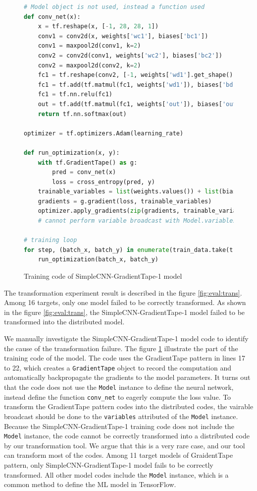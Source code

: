 \begin{figure}[!ht]
  \begin{lstlisting}[language=Python]
# Model object is not used, instead a function used
def conv_net(x):
    x = tf.reshape(x, [-1, 28, 28, 1])
    conv1 = conv2d(x, weights['wc1'], biases['bc1'])
    conv1 = maxpool2d(conv1, k=2)
    conv2 = conv2d(conv1, weights['wc2'], biases['bc2'])
    conv2 = maxpool2d(conv2, k=2)
    fc1 = tf.reshape(conv2, [-1, weights['wd1'].get_shape().as_list()[0]])
    fc1 = tf.add(tf.matmul(fc1, weights['wd1']), biases['bd1'])
    fc1 = tf.nn.relu(fc1)
    out = tf.add(tf.matmul(fc1, weights['out']), biases['out'])
    return tf.nn.softmax(out)

optimizer = tf.optimizers.Adam(learning_rate)

def run_optimization(x, y):
    with tf.GradientTape() as g:
        pred = conv_net(x)
        loss = cross_entropy(pred, y) 
    trainable_variables = list(weights.values()) + list(biases.values())
    gradients = g.gradient(loss, trainable_variables)
    optimizer.apply_gradients(zip(gradients, trainable_variables))
    # cannot perform variable broadcast with Model.variables

# training loop
for step, (batch_x, batch_y) in enumerate(train_data.take(training_steps), 1):
    run_optimization(batch_x, batch_y)
  \end{lstlisting}
  \caption{Training code of SimpleCNN-GradientTape-1 model}
  \label{fig:eval:simplecnn1}
\end{figure}

The transformation experiment result is described in the 
figure \ref{fig:eval:trans}. Among 16 targets, only one model failed to
be correctly transformed. As shown in the figure \ref{fig:eval:trans},
the SimpleCNN-GradientTape-1 model failed to be transformed into the
distributed model.

We manually investigate the SimpleCNN-GradientTape-1 model code to 
identify the cause of the transformation failure.
The figure \ref{fig:eval:simplecnn1} illustrate the part of the training code
of the model.
The code uses the GradientTape pattern in lines 17 to 22, which
creates a {\tt GradientTape} object to record the computation
and automatically backpropagate the gradients to the model parameters.
It turns out that the code does not use the {\tt Model} instance to
define the neural network, instead define the function {\tt conv\_net} 
to eagerly compute the loss value.
To transform the GradientTape pattern codes into the distributed codes,
the vairable broadcast should be done to the {\tt variables} attributed of
the {\tt Model} instance. Because the SimpleCNN-GradientTape-1 training code
does not include the {\tt Model} instance, the code cannot be correctly
transformed into a distributed code by our transformation tool.
We argue that this is a very rare case, and our tool can transform most of the
codes. Among 11 target models of GraidentTape pattern, only
SimpleCNN-GradientTape-1 model fails to be correctly transformed.
All other model codes include the {\tt Model} instance, 
which is a common method to define the ML model in TensorFlow. 





